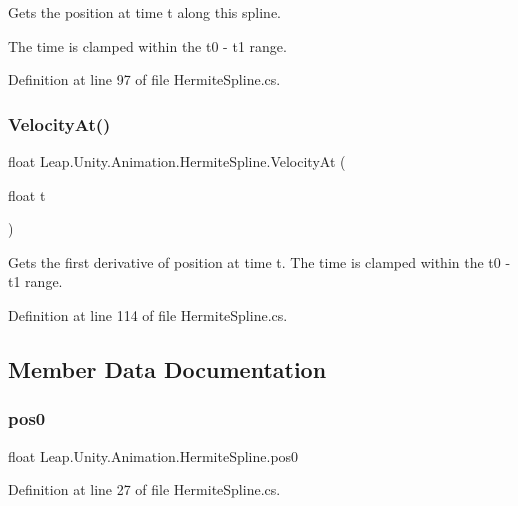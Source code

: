Gets the position at time t along this spline. 

The time is clamped within the t0 -\/ t1 range. 

Definition at line 97 of file Hermite\+Spline.\+cs.

\mbox{\label{struct_leap_1_1_unity_1_1_animation_1_1_hermite_spline_a8b5ecafdf1258f99abc38c0dbfa2a762}} 
\subsubsection{\texorpdfstring{VelocityAt()}{VelocityAt()}}
{\footnotesize\ttfamily float Leap.\+Unity.\+Animation.\+Hermite\+Spline.\+Velocity\+At (\begin{DoxyParamCaption}\item[{float}]{t }\end{DoxyParamCaption})}



Gets the first derivative of position at time t. The time is clamped within the t0 -\/ t1 range. 



Definition at line 114 of file Hermite\+Spline.\+cs.



\subsection{Member Data Documentation}
\mbox{\label{struct_leap_1_1_unity_1_1_animation_1_1_hermite_spline_a98993395f6b4ba8c68e7bcfe827bf308}} 
\subsubsection{\texorpdfstring{pos0}{pos0}}
{\footnotesize\ttfamily float Leap.\+Unity.\+Animation.\+Hermite\+Spline.\+pos0}



Definition at line 27 of file Hermite\+Spline.\+cs.

